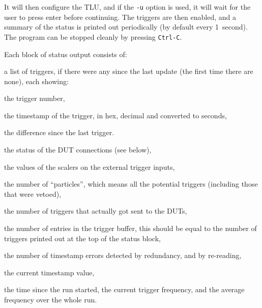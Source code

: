 It will then configure the \gls{TLU}, and if the \texttt{-u} option is used,
it will wait for the user to press enter before continuing.
The triggers are then enabled, and a summary of the status is printed out periodically
(by default every 1~second).
The program can be stopped cleanly by pressing \texttt{Ctrl-C}.

Each block of status output consists of:
\begin{myitemize}
\item a list of triggers, if there were any since the last update (the first time there are none),
each showing:
  \begin{myitemize}
  \item the trigger number,
  \item the timestamp of the trigger, in hex, decimal and converted to seconds,
  \item the difference since the last trigger.
  \end{myitemize}
\item the status of the \gls{DUT} connections (see below),
\item the values of the scalers on the external trigger inputs,
\item the number of ``particles'', which means all the potential triggers (including those that were vetoed),
\item the number of triggers that actually got sent to the \glspl{DUT},
\item the number of entries in the trigger buffer,
this should be equal to the number of triggers printed out at the top of the status block,
\item the number of timestamp errors detected by redundancy, and by re-reading,
\item the current timestamp value,
\item the time since the run started, the current trigger frequency, and the average frequency over the whole run.
\end{myitemize}

